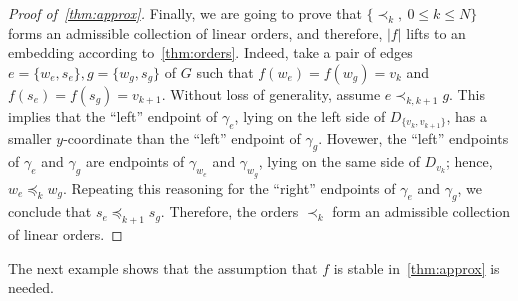 \documentclass[a4paper,12pt,reqno,oneside]{amsart}
\theoremstyle{plain}
\theoremstyle{definition}
\theoremstyle{plain}
\begin{document}
\begin{proof}[Proof of~\cref{thm:approx}]
  Finally, we are going to prove that $\{ \prec_k,\ 0 \leq k \leq N \}$ forms an admissible
  collection of linear orders, and therefore, $|f|$ lifts to an embedding according
  to~\cref{thm:orders}. Indeed, take a pair of edges $e = \{w_e, s_e\}, g = \{ w_g, s_g \}$ of $G$
  such that $f(w_e) = f(w_g) = v_k$ and $f(s_e) = f(s_g) = v_{k+1}$. Without loss of generality,
  assume $e \prec_{k, k+1} g$. This implies that the ``left'' endpoint of $\gamma_e$, lying on the
  left side of $D_{\{v_k, v_{k+1}\}}$, has a smaller $y$-coordinate than the ``left'' endpoint of
  $\gamma_g$. Hovewer, the ``left'' endpoints of $\gamma_e$ and $\gamma_g$ are endpoints of
  $\gamma_{w_e}$ and $\gamma_{w_g}$, lying on the same side of $D_{v_k}$; hence, $w_e \preceq_{k}
  w_g$. Repeating this reasoning for the ``right'' endpoints of $\gamma_e$ and $\gamma_g$, we
  conclude that $s_e \preceq_{k+1} s_g$. Therefore, the orders $\prec_k$ form an admissible
  collection of linear orders.
\end{proof}

The next example shows that the assumption that $f$ is stable in~\cref{thm:approx} is needed.
\end{document}

